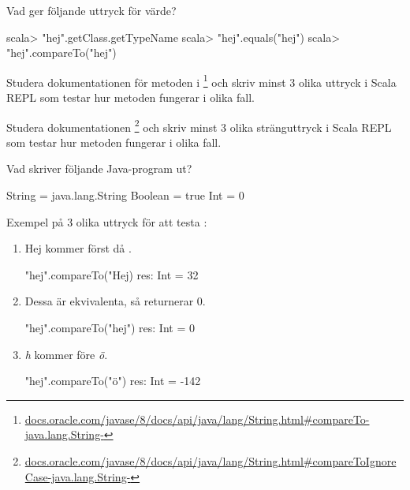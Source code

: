 \Subtask Vad ger följande uttryck för värde?

\begin{REPL}
scala> "hej".getClass.getTypeName
scala> "hej".equals("hej")
scala> "hej".compareTo("hej")
\end{REPL}


\Subtask Studera dokumentationen för metoden  i \footnote{\href{https://docs.oracle.com/javase/8/docs/api/java/lang/String.html\#compareTo-java.lang.String-}{docs.oracle.com/javase/8/docs/api/java/lang/String.html\#compareTo-java.lang.String-}} och skriv minst 3 olika uttryck i Scala REPL som testar hur metoden fungerar i olika fall.

\Subtask Studera dokumentationen  \footnote{\href{https://docs.oracle.com/javase/8/docs/api/java/lang/String.html\#compareToIgnoreCase-java.lang.String-}{docs.oracle.com/javase/8/docs/api/java/lang/String.html\#compareToIgnoreCase-java.lang.String-}} och skriv minst 3 olika stränguttryck i Scala REPL som testar hur metoden fungerar i olika fall.

\Subtask Vad skriver följande Java-program ut?


\SOLUTION


\TaskSolved \what

\SubtaskSolved
\begin{REPL}
String = java.lang.String
Boolean = true
Int = 0
\end{REPL}

\SubtaskSolved
Exempel på 3 olika uttryck för att testa :

\begin{enumerate}
\item
Hej kommer först då .
\begin{REPLnonum}
	"hej".compareTo("Hej)
	res: Int = 32
\end{REPLnonum}

\item
Dessa är ekvivalenta, så  returnerar 0.
\begin{REPLnonum}
	"hej".compareTo("hej")
	res: Int = 0
\end{REPLnonum}

\item
\emph{h} kommer före \emph{ö}.
\begin{REPLnonum}
	"hej".compareTo("ö")
	res: Int = -142
\end{REPLnonum}
\end{enumerate}

